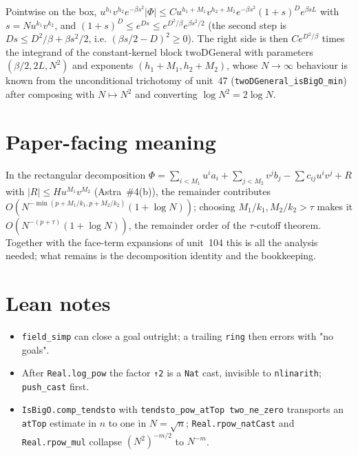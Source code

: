 \documentclass[11pt]{article}
\begin{document}
Pointwise on the box, $u^{h_1}v^{h_2}e^{-\beta s^2}|\Phi|\le Cu^{h_1+M_1}v^{h_2+M_2}e^{-\beta s^2}(1+s)^De^{\beta sL}$
with $s=Nu^{k_1}v^{k_2}$, and $(1+s)^D\le e^{Ds}\le e^{D^2/\beta}e^{\beta s^2/2}$ (the second step is
$Ds\le D^2/\beta+\beta s^2/2$, i.e. $(\beta s/2-D)^2\ge0$). The right side is then
$Ce^{D^2/\beta}$ times the integrand of the constant-kernel block $\mathrm{twoDGeneral}$ with
parameters $(\beta/2,2L,N^2)$ and exponents $(h_1+M_1,h_2+M_2)$, whose $N\to\infty$ behaviour is
known from the unconditional trichotomy of unit~47 (\texttt{twoDGeneral\_isBigO\_min}) after
composing with $N\mapsto N^2$ and converting $\log N^2=2\log N$.

\section{Paper-facing meaning}

In the rectangular decomposition $\Phi=\sum_{i<M_1}u^ia_i+\sum_{j<M_2}v^jb_j-\sum c_{ij}u^iv^j+R$
with $|R|\le Hu^{M_1}v^{M_2}$ (Astra~\#4(b)), the remainder contributes
$O(N^{-\min(p+M_1/k_1,p+M_2/k_2)}(1+\log N))$; choosing $M_1/k_1,M_2/k_2>\tau$ makes it
$O(N^{-(p+\tau)}(1+\log N))$, the remainder order of the $\tau$-cutoff theorem. Together with the
face-term expansions of unit~104 this is all the analysis needed; what remains is the decomposition
identity and the bookkeeping.

\section{Lean notes}

\begin{itemize}
\item \texttt{field\_simp} can close a goal outright; a trailing \texttt{ring} then errors with
"no goals".
\item After \texttt{Real.log\_pow} the factor \texttt{↑2} is a \texttt{Nat} cast, invisible to
\texttt{nlinarith}; \texttt{push\_cast} first.
\item \texttt{IsBigO.comp\_tendsto} with \texttt{tendsto\_pow\_atTop two\_ne\_zero} transports an
\texttt{atTop} estimate in $n$ to one in $N=\sqrt n$; \texttt{Real.rpow\_natCast} and
\texttt{Real.rpow\_mul} collapse $(N^2)^{-m/2}$ to $N^{-m}$.
\end{itemize}
\end{document}
